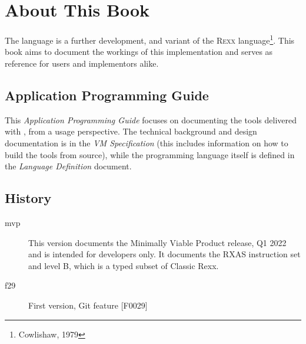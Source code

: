 \def\tightlist{}


\chapter*{About This Book}
The \crexx{} language is a further development, and variant of the
\textsc{Rexx} language\footnote{Cowlishaw, 1979}. This book aims to
document the workings of this implementation and serves as reference
for users and implementors alike.

\section*{Application Programming Guide}
This \emph{Application Programming Guide} focuses on documenting the
tools delivered with \crexx{}, from a usage perspective. The technical
background and design documentation is in the \emph{\crexx{} VM
  Specification} (this includes information on how to build the tools
from source), while the programming language itself is defined in
the \emph{\crexx{} Language Definition} document.

\section*{History}

\begin{description}
\item[mvp] This version documents the Minimally Viable Product
  release, Q1 2022 and is intended for developers only. It documents
  the RXAS instruction set and \crexx{} level B, which is a typed
  subset of Classic Rexx.
\item[f29] First version, Git feature [F0029]
\end{description}

